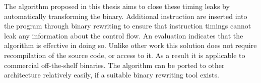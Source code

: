 The algorithm proposed in this thesis aims to close these timing leaks by automatically transforming the binary. 
Additional instruction are inserted into the program through binary rewriting to ensure that instruction 
timings cannot leak any information about the control flow. An evaluation indicates that the algorithm is effective in doing so.
Unlike other work this solution does not require recompilation of the 
source code, or access to it. 
As a result it is applicable to commercial off-the-shelf binaries.  
The algorithm can be ported to other architecture relatively easily, if a suitable binary rewriting tool exists.
